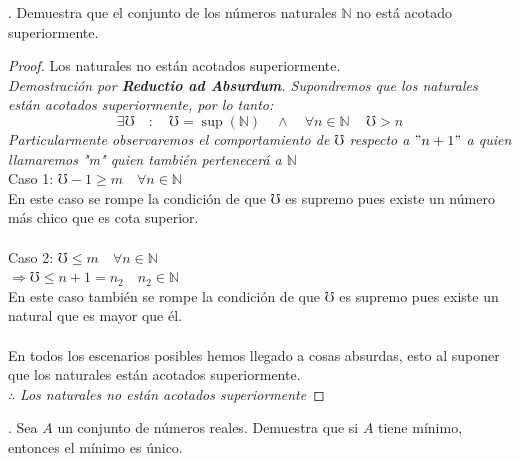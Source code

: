\documentclass{article}
\begin{document}
  . Demuestra que el conjunto de los números naturales \(\mathbb{N}\) no está acotado superiormente. \\
  \begin{proof}
    Los naturales no están acotados superiormente. \\
    \textit{Demostración por \textbf{Reductio ad Absurdum}. Supondremos que los naturales están acotados superiormente, por lo tanto:}
    \[ \exists \mho \quad : \quad \mho = \sup(\mathbb{N}) \quad \land \quad \forall n \in \mathbb{N} \, \quad \mho > n\]
    \textit{Particularmente observaremos el comportamiento de \(\mho\) respecto a \("n+1"\) a quien llamaremos "m" quien también pertenecerá a \(\mathbb{N}\)} \\
    Caso 1: \(\mho - 1 \geq m \quad \forall n \in \mathbb{N}\) \\
    En este caso se rompe la condición de que $\mho$ es supremo pues existe un número más chico que es cota superior.\\\\
    Caso 2: \(\mho \leq m \quad \forall n \in \mathbb{N}\) \\
    \( \Rightarrow \mho \leq n+1 = n_2 \quad n_2 \in \mathbb{N}\) \\
    En este caso también se rompe la condición de que $\mho$ es supremo pues existe un natural que es mayor que él.\\\\
    En todos los escenarios posibles hemos llegado a cosas absurdas, esto al suponer que los naturales están acotados superiormente.\\
    $\therefore$ \textit{Los naturales no están acotados superiormente}
    \end{proof}
  \vspace{1cm}
  . Sea \(A\) un conjunto de números reales. Demuestra que si \(A\) tiene mínimo, entonces el mínimo es único. \\
\end{document}
